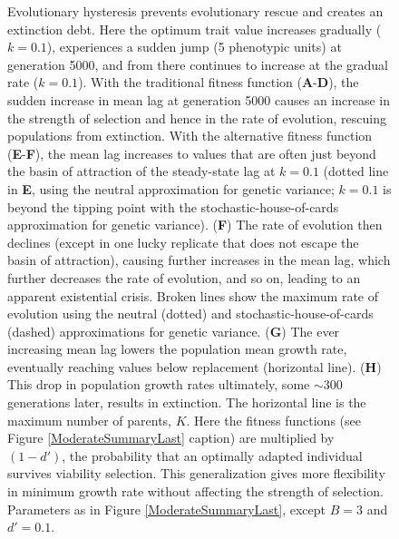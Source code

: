 \documentclass[12pt,letterpaper]{article} %
\begin{document}
\begin{figure}[!ht]
\centering
\caption{
Evolutionary hysteresis prevents evolutionary rescue and creates an extinction debt.
Here the optimum trait value increases gradually ($k=0.1$), experiences a sudden jump (5 phenotypic units) at generation 5000, and from there continues to increase at the gradual rate ($k=0.1$).  
With the traditional fitness function (\textbf{A}-\textbf{D}), the sudden increase in mean lag at generation 5000 causes an increase in the strength of selection and hence in the rate of evolution, rescuing populations from extinction.
With the alternative fitness function (\textbf{E}-\textbf{F}), the mean lag increases to values that are often just beyond the basin of attraction of the steady-state lag at $k=0.1$ (dotted line in \textbf{E}, using the neutral approximation for genetic variance; $k=0.1$ is beyond the tipping point with the stochastic-house-of-cards approximation for genetic variance).
(\textbf{F}) The rate of evolution then declines (except in one lucky replicate that does not escape the basin of attraction), causing further increases in the mean lag, which further decreases the rate of evolution, and so on, leading to an apparent existential crisis.
Broken lines show the maximum rate of evolution using the neutral (dotted) and stochastic-house-of-cards (dashed) approximations for genetic variance.
(\textbf{G}) The ever increasing mean lag lowers the population mean growth rate, eventually reaching values below replacement (horizontal line).
(\textbf{H}) This drop in population growth rates ultimately, some $\sim$300 generations later, results in extinction.
The horizontal line is the maximum number of parents, $K$.
Here the fitness functions (see Figure \ref{ModerateSummaryLast} caption) are multiplied by $(1-d')$, the probability that an optimally adapted individual survives viability selection.
This generalization gives more flexibility in minimum growth rate without affecting the strength of selection.
Parameters as in Figure \ref{ModerateSummaryLast}, except $B=3$ and $d'=0.1$.
}
\label{HysteresisSnapshot}
\end{figure}
\end{document}
